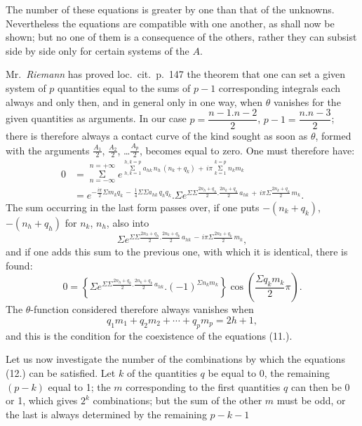 \documentclass{article}
\begin{document}

The number of these equations is greater by one than that of the unknowns. Nevertheless the equations are compatible with one another, as shall now be shown; but no one of them is a consequence of the others, rather they can subsist side by side only for certain systems of the $A$.

Mr.\ \emph{Riemann} has proved loc.\ cit.\ p.\ 147 the theorem that one can set a given system of $p$ quantities equal to the sums of $p-1$ corresponding integrals each always and only then, and in general only in one way, when $\theta$ vanishes for the given quantities as arguments. In our case $p = \dfrac{n-1.n-2}{2}$, $p-1 = \dfrac{n.n-3}{2}$; there is therefore always a contact curve of the kind sought as soon as $\theta$, formed with the arguments $\frac{A_{1}}{2}$, $\frac{A_{2}}{2}$, \ldots $\frac{A_{p}}{2}$, becomes equal to zero. One must therefore have:
\[
\begin{aligned}
0 &= \mathop{\Sigma}\limits_{n=-\infty}^{n=+\infty} e^{\mathop{\Sigma}\limits_{h,k=1}^{h,k=p} a_{hk}\,n_{h}\,(n_{k}+q_{k}) \,+\, i\pi \mathop{\Sigma}\limits_{k=1}^{k=p} n_{k}m_{k}}\\[2ex]
&= e^{-\frac{i\pi}{2}\Sigma m_{k}q_{k} \,-\, \frac{1}{4}\Sigma\Sigma a_{hk}\,q_{h}q_{k}}.\Sigma e^{\Sigma\Sigma \frac{2n_{h}+q_{h}}{2}.\frac{2n_{k}+q_{k}}{2}\,a_{hk} \,+\, i\pi\Sigma \frac{2n_{k}+q_{k}}{2}\,m_{k}}.
\end{aligned}
\]
The sum occurring in the last form passes over, if one puts $-(n_{k}+q_{k})$, $-(n_{h}+q_{h})$ for $n_{k}$, $n_{h}$, also into
\[
\Sigma e^{\Sigma\Sigma \frac{2n_{h}+q_{h}}{2}.\frac{2n_{k}+q_{k}}{2}\,a_{hk} \,-\, i\pi \Sigma \frac{2n_{k}+q_{k}}{2}\,m_{k}},
\]
and if one adds this sum to the previous one, with which it is identical, there is found:
\[
0 = \left\{ \Sigma e^{\Sigma\Sigma \frac{2n_{h}+q_{h}}{2}.\frac{2n_{k}+q_{k}}{2}\,a_{hk}}.(-1)^{\Sigma n_{k}m_{k}} \right\} \cos\left(\frac{\Sigma q_{k}m_{k}}{2}\pi\right).
\]
The $\theta$-function considered therefore always vanishes when
\[
q_{1}m_{1}+q_{2}m_{2}+\cdots+q_{p}m_{p} = 2h+1, \tag{12.}
\]
and this is the condition for the coexistence of the equations (11.).

Let us now investigate the number of the combinations by which the equations (12.) can be satisfied. Let $k$ of the quantities $q$ be equal to 0, the remaining $(p-k)$ equal to 1; the $m$ corresponding to the first quantities $q$ can then be 0 or 1, which gives $2^{k}$ combinations; but the sum of the other $m$ must be odd, or the last is always determined by the remaining $p-k-1$
\end{document}
